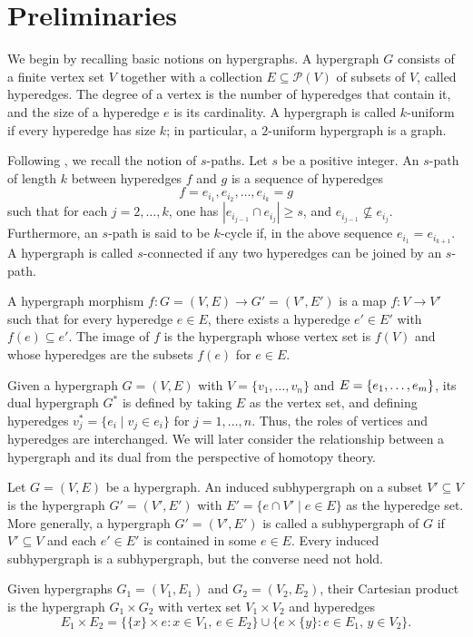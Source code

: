 \documentclass[10pt,a4paper]{amsart}
\begin{document}
\section{Preliminaries}\label{Sec_prelim}
We begin by recalling basic notions on hypergraphs. A hypergraph $G$ consists of a finite vertex set $V$ together with a collection $E \subseteq \mathcal{P}(V)$ of subsets of $V$, called hyperedges. The degree of a vertex is the number of hyperedges that contain it, and the size of a hyperedge $e$ is its cardinality. A hypergraph is called $k$-uniform if every hyperedge has size $k$; in particular, a $2$-uniform hypergraph is a graph.

Following \cite{HG_Emilie}, we recall the notion of $s$-paths. Let $s$ be a positive integer. An $s$-path of length $k$ between hyperedges $f$ and $g$ is a sequence of hyperedges
\[
f = e_{i_1}, e_{i_2}, \ldots, e_{i_k} = g
\]
such that for each $j = 2, \ldots, k$, one has $|e_{i_{j-1}} \cap e_{i_j}| \geq s$, and $e_{i_{j-1}} \not\subseteq e_{i_j}$. Furthermore, an $s$-path is said to be $k$-cycle if, in the above sequence $e_{i_1}=e_{i_{k+1}}$. A hypergraph is called $s$-connected if any two hyperedges can be joined by an $s$-path. 

A hypergraph morphism $f \colon G=(V,E) \to G'=(V',E')$ is a map $f \colon V \to V'$ such that for every hyperedge $e \in E$, there exists a hyperedge $e' \in E'$ with $f(e) \subseteq e'$. The image of $f$ is the hypergraph whose vertex set is $f(V)$ and whose hyperedges are the subsets $f(e)$ for $e \in E$.

Given a hypergraph $G=(V,E)$ with $V=\{v_1,\dots,v_n\}$ and $E=\{e_1,\dots,\\ e_m\}$, its dual hypergraph $G^*$ is defined by taking $E$ as the vertex set, and defining hyperedges $v_j^* = \{ e_i \mid v_j \in e_i \}$ for $j=1,\dots,n$. Thus, the roles of vertices and hyperedges are interchanged. We will later consider the relationship between a hypergraph and its dual from the perspective of homotopy theory.

Let $G=(V,E)$ be a hypergraph. An induced subhypergraph on a subset $V' \subseteq V$ is the hypergraph $G'=(V', E')$ with $E'=\{ e \cap V' \mid e \in E \}$ as the hyperedge set. More generally, a hypergraph $G'=(V',E')$ is called a subhypergraph of $G$ if $V' \subseteq V$ and each $e' \in E'$ is contained in some $e \in E$. Every induced subhypergraph is a subhypergraph, but the converse need not hold.

Given hypergraphs $G_1=(V_1,E_1)$ and $G_2=(V_2,E_2)$, their Cartesian product is the hypergraph $G_1 \times G_2$ with vertex set $V_1 \times V_2$ and hyperedges
\[
E_1 \times E_2 = \{ \{x\} \times e : x \in V_1,\, e \in E_2 \} \cup \{ e \times \{y\} : e \in E_1,\, y \in V_2 \}.
\]
\end{document}
